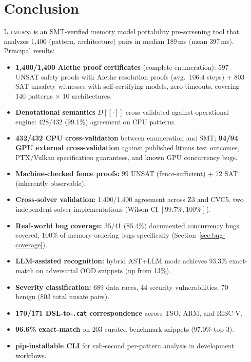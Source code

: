 \documentclass[11pt]{article}
\newcommand{\litmus}{\textsc{Litmus$\infty$}}
\begin{document}
\section{Conclusion}
\label{sec:conclusion}

\litmus{} is an SMT-verified memory model portability pre-screening
tool that analyzes 1{,}400 (pattern, architecture) pairs in median
189\,ms (mean 397\,ms).
Principal results:

\begin{itemize}[nosep]
\item \textbf{1{,}400/1{,}400 Alethe proof certificates} (complete enumeration):
  597 UNSAT safety proofs with Alethe resolution proofs (avg.\ 106.4 steps) +
  803 SAT unsafety witnesses with self-certifying models, zero timeouts,
  covering 140 patterns $\times$ 10 architectures.
\item \textbf{Denotational semantics} $D[\![\cdot]\!]$ cross-validated
  against operational engine: 428/432 (99.1\%) agreement on CPU patterns.
\item \textbf{432/432 CPU cross-validation} between enumeration and SMT;
  \textbf{94/94 GPU external cross-validation} against published
  litmus test outcomes, PTX/Vulkan specification guarantees,
  and known GPU concurrency bugs.
\item \textbf{Machine-checked fence proofs:} 99 UNSAT
  (fence-sufficient) + 72 SAT (inherently observable).
\item \textbf{Cross-solver validation:} 1{,}400/1{,}400 agreement
  across Z3 and CVC5, two independent solver implementations
  (Wilson CI $[99.7\%, 100\%]$).
\item \textbf{Real-world bug coverage:} 35/41 (85.4\%) documented
  concurrency bugs covered; 100\% of memory-ordering bugs
  specifically (Section~\ref{sec:bug-coverage}).
\item \textbf{LLM-assisted recognition:} hybrid AST+LLM mode achieves
  93.3\% exact-match on adversarial OOD snippets (up from 13\%).
\item \textbf{Severity classification:} 689 data races, 44
  security vulnerabilities, 70 benign (803 total unsafe pairs).
\item \textbf{170/171 DSL-to-\texttt{.cat} correspondence}
  across TSO, ARM, and RISC-V.
\item \textbf{96.6\% exact-match} on 203 curated benchmark snippets
  (97.0\% top-3).
\item \textbf{pip-installable CLI} for sub-second
  per-pattern analysis in development workflows.
\end{itemize}
\end{document}
